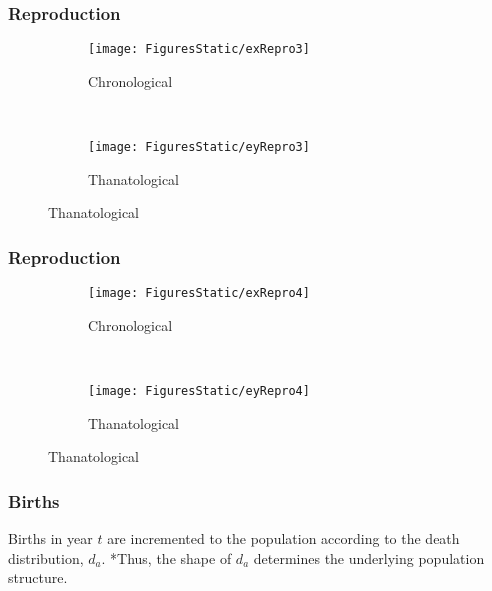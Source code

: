 \documentclass{beamer}
\begin{document}
\begin{frame}
\frametitle{Reproduction}
\vspace{-5em}
\begin{figure}
        \centering
        \begin{subfigure}[b]{0.5\textwidth}
                \centering
                \caption*{Chronological}
                \texttt{[image: FiguresStatic/exRepro3]}
        \end{subfigure}%
        ~ %
        \begin{subfigure}[b]{0.5\textwidth}
                \centering
                \caption*{Thanatological}
                \texttt{[image: FiguresStatic/eyRepro3]}
        \end{subfigure}
\end{figure}
\end{frame}

\begin{frame}
\frametitle{Reproduction}
\vspace{-5em}
\begin{figure}
        \centering
        \begin{subfigure}[b]{0.5\textwidth}
                \centering
                \caption*{Chronological}
                \texttt{[image: FiguresStatic/exRepro4]}
        \end{subfigure}%
        ~ %
        \begin{subfigure}[b]{0.5\textwidth}
                \centering
                \caption*{Thanatological}
                \texttt{[image: FiguresStatic/eyRepro4]}
        \end{subfigure}
\end{figure}
\end{frame}
\begin{frame}
\frametitle{Births}
\begin{center}
Births in year $t$ are incremented to the population according to the death
distribution, $d_a$.
\vskip2pt
\pause
*Thus, the shape of $d_a$ determines the underlying population structure.
\end{center}
\end{frame}
\end{document}
